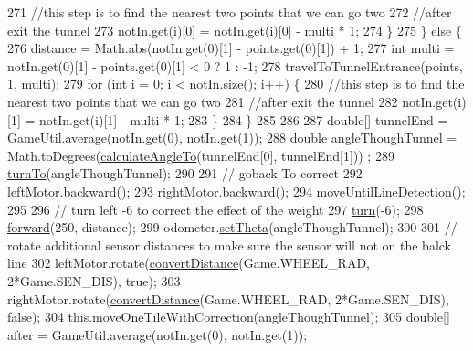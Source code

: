 \begin{DoxyCode}
271         \textcolor{comment}{//this step is to find the nearest two points that we can go two}
272         \textcolor{comment}{//after exit the tunnel}
273         notIn.get(i)[0] = notIn.get(i)[0] - multi * 1;
274       \}
275     \} \textcolor{keywordflow}{else} \{
276       distance = Math.abs(notIn.get(0)[1] - points.get(0)[1]) + 1;
277       \textcolor{keywordtype}{int} multi = notIn.get(0)[1] - points.get(0)[1] < 0 ? 1 : -1;
278       travelToTunnelEntrance(points, 1, multi);
279       \textcolor{keywordflow}{for} (\textcolor{keywordtype}{int} i = 0; i < notIn.size(); i++) \{
280       \textcolor{comment}{//this step is to find the nearest two points that we can go two}
281       \textcolor{comment}{//after exit the tunnel}
282         notIn.get(i)[1] = notIn.get(i)[1] - multi * 1;
283       \}
284     \}
285 
286     
287     \textcolor{keywordtype}{double}[] tunnelEnd = GameUtil.average(notIn.get(0), notIn.get(1));
288     \textcolor{keywordtype}{double} angleThoughTunnel = Math.toDegrees(\hyperlink{classca_1_1mcgill_1_1ecse211_1_1project_1_1_navigation_a4376e54162df8f123ca3b52e4fd2f38d}{calculateAngleTo}(tunnelEnd[0], tunnelEnd[1]))
      ;
289     \hyperlink{classca_1_1mcgill_1_1ecse211_1_1project_1_1_navigation_a3bbe0645f2b3b3d0986b4a707fb5a00c}{turnTo}(angleThoughTunnel);
290     
291     \textcolor{comment}{// goback To correct}
292     leftMotor.backward();
293     rightMotor.backward();
294     moveUntilLineDetection();
295 
296     \textcolor{comment}{// turn left -6 to correct the effect of the weight}
297     \hyperlink{classca_1_1mcgill_1_1ecse211_1_1project_1_1_navigation_ad74286ad36d333bfaf57661837457b76}{turn}(-6);
298     \hyperlink{classca_1_1mcgill_1_1ecse211_1_1project_1_1_navigation_a7c66610c5b7496ddb35d342ab2cd3f08}{forward}(250, distance);
299     odometer.\hyperlink{classca_1_1mcgill_1_1ecse211_1_1odometer_1_1_odometer_data_a419b8f07c2c5374411c8e62298e9a402}{setTheta}(angleThoughTunnel);
300 
301     \textcolor{comment}{// rotate additional sensor distances to make sure the sensor will not on the balck line}
302     leftMotor.rotate(\hyperlink{classca_1_1mcgill_1_1ecse211_1_1project_1_1_navigation_ac9e260bcd619ffa4820d7d0de7ea1c12}{convertDistance}(Game.WHEEL\_RAD, 2*Game.SEN\_DIS), \textcolor{keyword}{true});
303     rightMotor.rotate(\hyperlink{classca_1_1mcgill_1_1ecse211_1_1project_1_1_navigation_ac9e260bcd619ffa4820d7d0de7ea1c12}{convertDistance}(Game.WHEEL\_RAD, 2*Game.SEN\_DIS), \textcolor{keyword}{false});
304     this.moveOneTileWithCorrection(angleThoughTunnel);
305     \textcolor{keywordtype}{double}[] after = GameUtil.average(notIn.get(0), notIn.get(1));

\end{DoxyCode}
